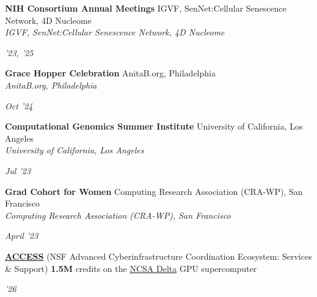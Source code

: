 \documentclass[11pt,letterpaper]{article}
\newlength{\cvlabelw}\setlength{\cvlabelw}{1.15in}   %
\newlength{\cvlabelsep}\setlength{\cvlabelsep}{0.15in}%
\newlength{\cvdatew}\setlength{\cvdatew}{1.15in}     %
\newcommand{\cvsection}[1]{%
  \par\addvspace{\baselineskip}\needspace{3\baselineskip}%
  \noindent\llap{\raisebox{0pt}[\height][0pt]{%
    \parbox[t]{\cvlabelw}{\raggedright\normalfont\scshape\bfseries
      \textcolor{sectionpurple}{#1}}}\hspace{\cvlabelsep}}%
  \nopagebreak\ignorespaces}
\newcommand{\entry}[2]{%
  \parbox[t]{\dimexpr\linewidth-\cvdatew-\cvlabelsep\relax}{\raggedright #1}%
  \hfill
  \parbox[t]{\cvdatew}{\raggedleft\small\textsl{#2}}\par}
\newcommand{\expentry}[4]{%
  \parbox[t]{\dimexpr\linewidth-\cvdatew-\cvlabelsep\relax}{\raggedright
    \textbf{#1}%
    \ifx\relax#3\relax\else\\[1.5pt]\textsl{#3}\fi
    \ifx\relax#4\relax\else\\[2pt]#4\fi}%
  \hfill
  \parbox[t]{\cvdatew}{\raggedleft\small\textsl{#2}}%
  \par\addvspace{5pt}}
\begin{document}
\cvsection{Consortiums \& Workshops}%
{\setlength{\parskip}{0pt}%
\renewcommand{\expentry}[4]{%
  \parbox[t]{\dimexpr\linewidth-\cvdatew-\cvlabelsep\relax}{\raggedright
    \textbf{#1}%
    \ifx\relax#3\relax\else\\[1.5pt]\textsl{#3}\fi
    \ifx\relax#4\relax\else\\[2pt]#4\fi}%
  \hfill
  \parbox[t]{\cvdatew}{\raggedleft\small\textsl{#2}}%
  \par\addvspace{1.5pt}}%
\expentry{NIH Consortium Annual Meetings}{'23, '25}
  {IGVF, SenNet:Cellular Senescence Network, 4D Nucleome}{}
\expentry{Grace Hopper Celebration}{Oct '24}
  {AnitaB.org, Philadelphia}{}
\expentry{Computational Genomics Summer Institute}{Jul '23}
  {University of California, Los Angeles}{}
\expentry{Grad Cohort for Women}{April '23}
  {Computing Research Association (CRA-WP), San Francisco}{}%
}%

\cvsection{Compute Allocation Grants}%
{\setlength{\cvdatew}{0.6in}%
\entry{\href{https://allocations.access-ci.org/}{\textbf{ACCESS}} (NSF Advanced Cyberinfrastructure Coordination Ecosystem: Services \& Support) \textbf{1.5M} credits on the \href{https://www.ncsa.illinois.edu/resources-and-services/compute-resources/delta/}{NCSA Delta} GPU supercomputer}{'26}
}%
\end{document}
